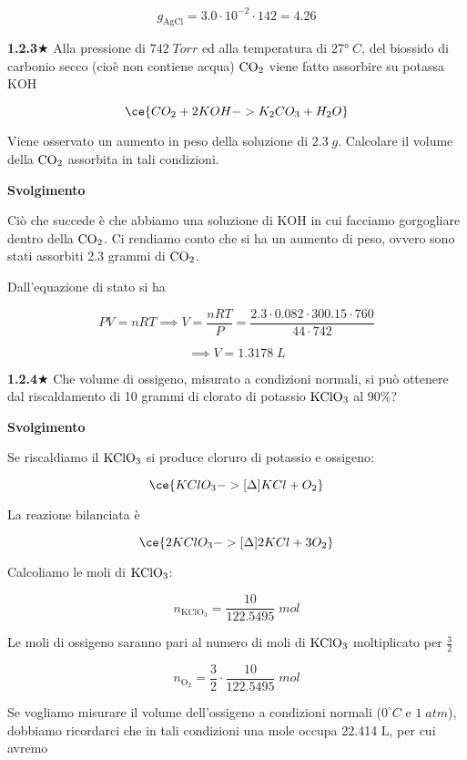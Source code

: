 $$g_{\text{AgCl}}=3.0 \cdot 10^{-2} \cdot 142=4.26$$

\vspace{0.2cm}\textbf{1.2.3}$\bigstar$ Alla pressione di $742\;Torr$ ed alla temperatura di 27°$\;C$, del biossido di carbonio secco (cioè non contiene acqua) $\rm CO_2$ viene fatto assorbire su potassa KOH 

$$\ce{CO_2 + 2KOH -> K_2CO_3 + H_2O}$$

Viene osservato un aumento in peso della soluzione di $2.3\;g$. Calcolare il volume della $\rm CO_2$ assorbita in tali condizioni.

\vspace{0.2cm}\large\textbf{Svolgimento}\normalsize

\vspace{0.2cm}Ciò che succede è che abbiamo una soluzione di KOH in cui facciamo gorgogliare dentro della $\rm CO_2$. Ci rendiamo conto che si ha un aumento di peso, ovvero sono stati assorbiti 2.3 grammi di $\rm CO_2$.

Dall'equazione di stato si ha

$$PV=nRT
\implies
V=\frac{nRT}{P}=\frac{2.3 \cdot 0.082 \cdot 300.15 \cdot 760}{44 \cdot 742}$$

$$\implies V=1.3178\;L$$

\vspace{0.2cm}\textbf{1.2.4}$\bigstar$ Che volume di ossigeno, misurato a condizioni normali, si può ottenere dal riscaldamento di 10 grammi di clorato di potassio $\rm KClO_3$ al 90\%?

\vspace{0.2cm}\large\textbf{Svolgimento}\normalsize

\vspace{0.2cm}Se riscaldiamo il $\rm KClO_3$ si produce cloruro di potassio e ossigeno:

$$\ce{KClO_3 ->[{\Delta}] KCl + O_2}$$

La reazione bilanciata è

$$\ce{2KClO_3 ->[{\Delta}] 2KCl + 3O_2}$$

Calcoliamo le moli di $\rm KClO_3$:

$$n_{\text{KClO}_3}=\frac{10}{122.5495}\;mol$$

Le moli di ossigeno saranno pari al numero di moli di $\rm KClO_3$ moltiplicato per $\frac{3}{2}$

$$n_{\text{O}_2}=\frac{3}{2}\cdot\frac{10}{122.5495}\;mol$$

Se vogliamo misurare il volume dell'ossigeno a condizioni normali ($0^{\circ}C$ e $1\;atm$), dobbiamo ricordarci che in tali condizioni una mole occupa 22.414 L, per cui avremo

